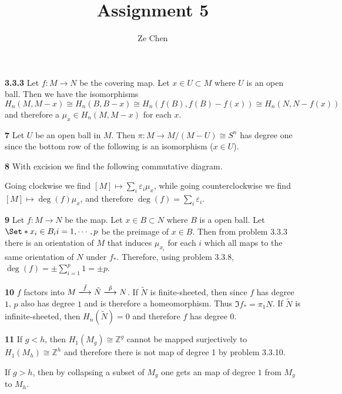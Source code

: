 \documentclass{article}
\title{Assignment 5}
\author{Ze Chen}
\makeatletter
\newcommand*{\shifttext}[1]{%
  \settowidth{\@tempdima}{#1}%
  \hspace{-\@tempdima}#1%
}
\newcommand{\plabel}[1]{%
\shifttext{\textbf{#1}\quad}%
}
\makeatother
\begin{document}
\maketitle

\plabel{3.3.3}%
Let $f:M\rightarrow N$ be the covering map.
Let $x\in U\subset M$ where $U$ is an open ball.
Then we have the isomorphisms
\[ H_n(M,M-x) \cong H_n(B,B-x) \cong H_n(f(B), f(B) - f(x)) \cong H_n(N,N-f(x)) \]
and therefore a $\mu_x\in H_n(M,M-x)$ for each $x$.

\plabel{7}%
Let $U$ be an open ball in $M$.
Then $\pi: M \rightarrow M/(M-U) \cong S^n$ has degree one since the bottom row of the following is an isomorphism ($x\in U$).
\begin{center}
\end{center}

\plabel{8}%
With excision we find the following commutative diagram.
\begin{center}
\end{center}
Going clockwise we find $[M] \mapsto \sum_i \varepsilon_i \mu_x$, while going counterclockwise we find $[M] \mapsto \operatorname{deg}(f)\mu_x$, and therefore $\operatorname{deg}(f) = \sum_i \varepsilon_i$.

\plabel{9}%
Let $f:M\rightarrow N$ be the map.
Let $x\in B\subset N$ where $B$ is a open ball.
Let $\Set*{x_i\in B_i}{i=1,\cdots,p}$ be the preimage of $x\in B$.
Then from problem 3.3.3 there is an orientation of $M$ that induces $\mu_{x_i}$ for each $i$ which all maps to the same orientation of $N$ under $f_*$.
Therefore, using problem 3.3.8, $\operatorname{deg}(f) = \pm \sum_{i=1}^p 1 = \pm p$.

\plabel{10}%
$f$ factors into $M\xlongrightarrow{\tilde{f}}\tilde{N}\xlongrightarrow{\tilde{p}}N$.
If $\tilde{N}$ is finite-sheeted, then since $f$ has degree $1$, $p$ also has degree $1$ and is therefore a homeomorphism.
Thus $\Im f_* = \pi_1 N$.
If $\tilde{N}$ is infinite-sheeted, then $H_n(\tilde{N}) = 0$ and therefore $f$ has degree $0$.

\plabel{11}%
If $g<h$, then $H_1(M_g) \cong \mathbb{Z}^g$ cannot be mapped surjectively to $H_1(M_h) \cong \mathbb{Z}^h$ and therefore there is not map of degree 1 by problem 3.3.10.
\par
If $g>h$, then by collapsing a subset of $M_g$ one gets an map of degree $1$ from $M_g$ to $M_h$.
\end{document}
